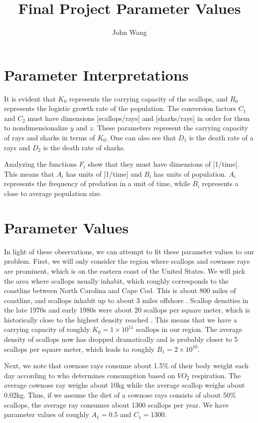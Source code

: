 \documentclass{article}
\begin{document}
\title{Final Project Parameter Values}
\author{John Wang}
\maketitle

\section{Parameter Interpretations}

It is evident that $K_0$ represents the carrying capacity of the scallops, and $R_0$ represents the logistic growth rate of the population. The conversion factors $C_1$ and $C_2$ must have dimensions [scallops/rays] and [sharks/rays] in order for them to nondimensionalize $y$ and $z$. These parameters represent the carrying capacity of rays and sharks in terms of $K_0$. One can also see that $D_1$ is the death rate of a rays and $D_2$ is the death rate of sharks. 

Analyzing the functions $F_i$ show that they must have dimensions of [1/time]. This means that $A_i$ has units of [1/time] and $B_i$ has units of population. $A_i$ represents the frequency of predation in a unit of time, while $B_i$ represents a close to average population size. 

\section{Parameter Values}

In light of these observations, we can attempt to fit these parameter values to our problem. First, we will only consider the region where scallops and cownose rays are prominent, which is on the eastern coast of the United States. We will pick the area where scallops usually inhabit, which roughly corresponds to the coastline between North Carolina and Cape Cod. This is about 800 miles of coastline, and scallops inhabit up to about 3 miles offshore \cite{Fay(1983)}. Scallop densities in the late 1970s and early 1980s were about 20 scallops per square meter, which is historically close to the highest density reached \cite{Fay(1983)}. This means that we have a carrying capacity of roughly $K_0 = 1 \times 10^{11}$ scallops in our region. The average density of scallops now has dropped dramatically and is probably closer to 5 scallops per square meter, which leads to roughly $B_1 = 2 \times 10^{10}$. 

Next, we note that cownose rays consume about 1.5\% of their body weight each day according to \cite{Neer(2005)} who determines consumption based on $VO_2$ respiration. The average cownose ray weighs about 10kg while the average scallop weighs about 0.02kg. Thus, if we assume the diet of a cownose rays consists of about 50\% scallops, the average ray consumes about 1300 scallops per year. We have parameter values of roughly $A_1 = 0.5$ and $C_1 = 1300$. 
\end{document}
